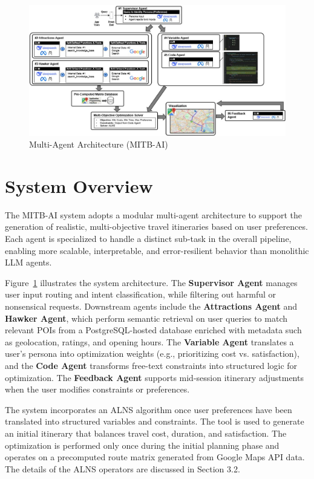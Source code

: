 \documentclass{ecai}
\begin{document}
\FloatBarrier
\begin{figure}[h]
    \centering
    \includegraphics[width=0.75\linewidth]{MITB AI Architecture Image.jpg}
    \caption{Multi-Agent Architecture (MITB-AI)}
    \label{fig:Workflow Diagram}
\end{figure}
    
\section{System Overview}
The MITB-AI system adopts a modular multi-agent architecture to support the generation of realistic, multi-objective travel itineraries based on user preferences. Each agent is specialized to handle a distinct sub-task in the overall pipeline, enabling more scalable, interpretable, and error-resilient behavior than monolithic LLM agents.

Figure~\ref{fig:Workflow Diagram} illustrates the system architecture. The \textbf{Supervisor Agent} manages user input routing and intent classification, while filtering out harmful or nonsensical requests. Downstream agents include the \textbf{Attractions Agent} and \textbf{Hawker Agent}, which perform semantic retrieval on user queries to match relevant POIs from a PostgreSQL-hosted database enriched with metadata such as geolocation, ratings, and opening hours. The \textbf{Variable Agent} translates a user’s persona into optimization weights (e.g., prioritizing cost vs. satisfaction), and the \textbf{Code Agent} transforms free-text constraints into structured logic for optimization. The \textbf{Feedback Agent} supports mid-session itinerary adjustments when the user modifies constraints or preferences.

The system incorporates an ALNS algorithm once user preferences have been translated into structured variables and constraints. The tool is used to generate an initial itinerary that balances travel cost, duration, and satisfaction. The optimization is performed only once during the initial planning phase and operates on a precomputed route matrix generated from Google Maps API data. The details of the ALNS operators are discussed in Section 3.2.
\end{document}
